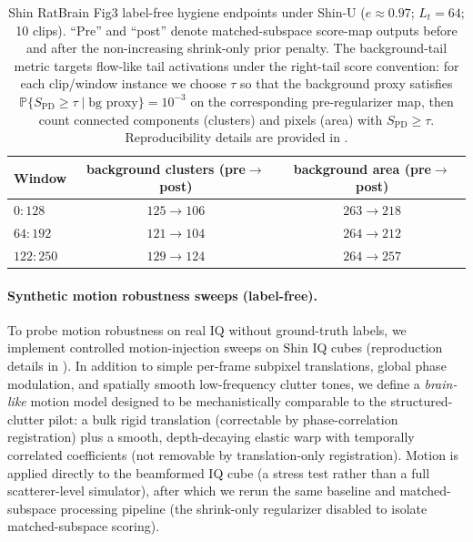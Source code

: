 \begin{table}[t]
\centering
\small
\begin{tabular}{lcc}
\hline
Window & background clusters (pre$\rightarrow$post) & background area (pre$\rightarrow$post) \\
\hline
$0{:}128$ & $125\rightarrow 106$ & $263\rightarrow 218$ \\
$64{:}192$ & $121\rightarrow 104$ & $264\rightarrow 212$ \\
$122{:}250$ & $129\rightarrow 124$ & $264\rightarrow 257$ \\
\hline
\end{tabular}
\caption{Shin RatBrain Fig3 label-free hygiene endpoints under Shin-U ($e\approx 0.97$; $L_t=64$; 10 clips). ``Pre'' and ``post'' denote matched-subspace score-map outputs before and after the non-increasing shrink-only prior penalty. The background-tail metric targets flow-like tail activations under the right-tail score convention: for each clip/window instance we choose $\tau$ so that the background proxy satisfies $\mathbb{P}\{S_{\mathrm{PD}}\ge\tau\mid \text{bg proxy}\}=10^{-3}$ on the corresponding pre-regularizer map, then count connected components (clusters) and pixels (area) with $S_{\mathrm{PD}}\ge\tau$. Reproducibility details are provided in .}
\label{tab:shin_hygiene}
\end{table}

\paragraph{Synthetic motion robustness sweeps (label-free).}
To probe motion robustness on real IQ without ground-truth labels, we implement controlled motion-injection sweeps on Shin IQ cubes (reproduction details in ). In addition to simple per-frame subpixel translations, global phase modulation, and spatially smooth low-frequency clutter tones, we define a \emph{brain-like} motion model designed to be mechanistically comparable to the structured-clutter pilot: a bulk rigid translation (correctable by phase-correlation registration) plus a smooth, depth-decaying elastic warp with temporally correlated coefficients (not removable by translation-only registration). Motion is applied directly to the beamformed IQ cube (a stress test rather than a full scatterer-level simulator), after which we rerun the same baseline and matched-subspace processing pipeline (the shrink-only regularizer disabled to isolate matched-subspace scoring).


